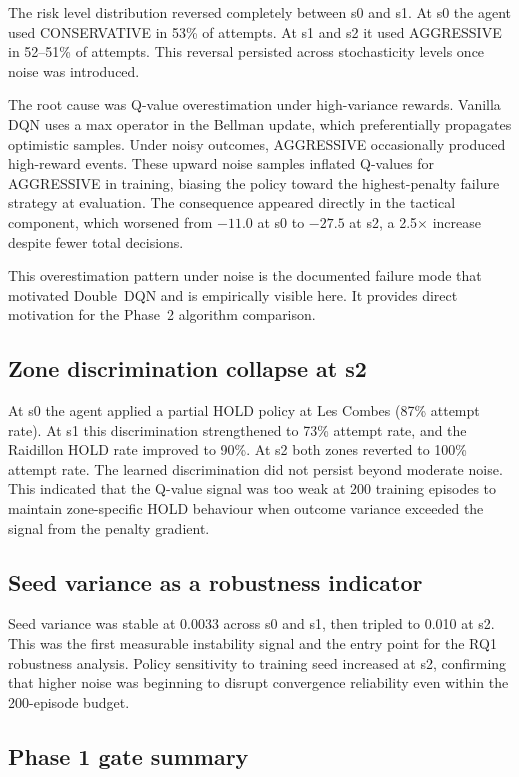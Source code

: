 \begin{appendices}
The risk level distribution reversed completely between s0 and s1. At s0 the agent used CONSERVATIVE in 53\% of attempts. At s1 and s2 it used AGGRESSIVE in 52--51\% of attempts. This reversal persisted across stochasticity levels once noise was introduced.

The root cause was Q-value overestimation under high-variance rewards. Vanilla DQN uses a max operator in the Bellman update, which preferentially propagates optimistic samples. Under noisy outcomes, AGGRESSIVE occasionally produced high-reward events. These upward noise samples inflated Q-values for AGGRESSIVE in training, biasing the policy toward the highest-penalty failure strategy at evaluation. The consequence appeared directly in the tactical component, which worsened from $-11.0$ at s0 to $-27.5$ at s2, a 2.5$\times$ increase despite fewer total decisions.

This overestimation pattern under noise is the documented failure mode that motivated Double~DQN and is empirically visible here. It provides direct motivation for the Phase~2 algorithm comparison.

\subsection{Zone discrimination collapse at s2}

At s0 the agent applied a partial HOLD policy at Les Combes (87\% attempt rate). At s1 this discrimination strengthened to 73\% attempt rate, and the Raidillon HOLD rate improved to 90\%. At s2 both zones reverted to 100\% attempt rate. The learned discrimination did not persist beyond moderate noise. This indicated that the Q-value signal was too weak at 200 training episodes to maintain zone-specific HOLD behaviour when outcome variance exceeded the signal from the penalty gradient.

\subsection{Seed variance as a robustness indicator}

Seed variance was stable at 0.0033 across s0 and s1, then tripled to 0.010 at s2. This was the first measurable instability signal and the entry point for the RQ1 robustness analysis. Policy sensitivity to training seed increased at s2, confirming that higher noise was beginning to disrupt convergence reliability even within the 200-episode budget.

\subsection{Phase 1 gate summary}


\end{appendices}
